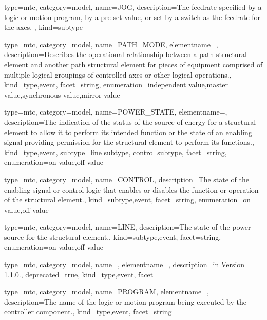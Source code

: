 {
  type=mtc,
  category=model,
  name={JOG},
  description={The feedrate specified by a logic or motion program, by a pre-set value, or set by a switch as the feedrate for the \gls{axes}. },
  kind={subtype}
}


{
  type=mtc,
  category=model,
  name={PATH\_MODE},
  elementname=,
  description={Describes the operational relationship between a \gls{path} \gls{structural element} and another \gls{path} \gls{structural element} for pieces of equipment comprised of multiple logical groupings of controlled axes or other logical operations.},
  kind={type,event},
  facet={\gls{string}},
  enumeration={\gls{independent value},\gls{master value},\gls{synchronous value},\gls{mirror value}}
}


{
  type=mtc,
  category=model,
  name={POWER\_STATE},
  elementname=,
  description={The indication of the status of the source of energy for a \gls{structural element} to allow it to perform its intended function or the state of an enabling signal providing permission for the \gls{structural element} to perform its functions.},
  kind={type,event},
  subtype={\gls{line subtype}, \gls{control subtype}},
  facet={\gls{string}},
  enumeration={\gls{on value},\gls{off value}}
}


{
  type=mtc,
  category=model,
  name={CONTROL},
  description={The state of the enabling signal or control logic that enables or disables the function or operation of the \gls{structural element}.},
  kind={subtype,event},
  facet={\gls{string}},
  enumeration={\gls{on value},\gls{off value}}
}


{
  type=mtc,
  category=model,
  name={LINE},
  description={The state of the power source for the \gls{structural element}.},
  kind={subtype,event},
  facet={\gls{string}},
  enumeration={\gls{on value},\gls{off value}}
}


{
  type=mtc,
  category=model,
  name=,
  elementname=,
  description={\DEPRECATED in Version 1.1.0.},
  deprecated={true},
  kind={type,event},
  facet={}
}


{
  type=mtc,
  category=model,
  name={PROGRAM},
  elementname=,
  description={The name of the logic or motion program being executed by the \gls{controller} component.},
  kind={type,event},
  facet={\gls{string}}
}


